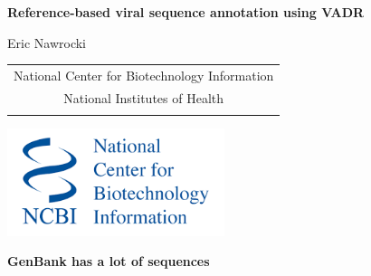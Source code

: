 \documentclass[landscape]{slides}
\begin{document}
\begin{slide}
\begin{center}
\large{\textbf{Reference-based viral sequence annotation using VADR}}

\normalsize

Eric Nawrocki \\

\medskip

\medskip

\medskip

\medskip

\medskip

\small
\begin{tabular}{c}
National Center for Biotechnology Information\\
National Institutes of Health\\
\\
\end{tabular}

\vspace{0.1in}

\includegraphics[width=2.5in]{figs/ncbi-logo}

\end{center}
\end{slide}
\begin{slide}
\begin{center}
\textbf{GenBank has a lot of sequences}
\end{center}

\vfill
\end{slide}
\end{document}
